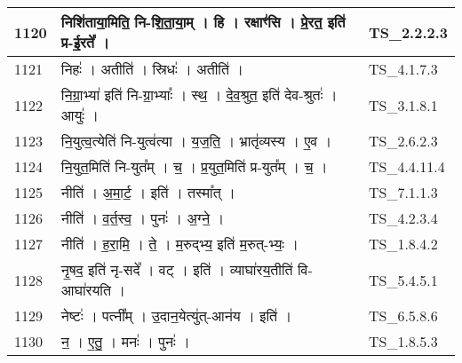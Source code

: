 \documentclass[17pt]{extarticle}
\begin{document}
\begin{longtable}{||p{0.4in}||p{4.9in}||p{0.9in}||}
    1120 & निशि॑ताया॒मिति॒ नि{-}शि॒ता॒या॒म्   ।   हि   ।   रक्षाꣳ॑सि   ।   प्रे॒रत॒ इति॑ प्र{-}ई॒रते᳚   ।    & TS\_2.2.2.3       \\
    
    \hline
        
    1121 & निहः॑   ।   अतीति॑   ।   स्रिधः॑   ।   अतीति॑   ।    & TS\_4.1.7.3       \\
    
    \hline
        
    1122 & नि॒ग्रा॒भ्या॑ इति॑ नि{-}ग्रा॒भ्याः᳚   ।   स्थ॒   ।   दे॒व॒श्रुत॒ इति॑ देव{-}श्रुतः॑   ।   आयुः॑   ।    & TS\_3.1.8.1       \\
    
    \hline
        
    1123 & नि॒युत्व॒त्येति॑ नि{-}युत्व॑त्या   ।   य॒ज॒ति॒   ।   भ्रातृ॑व्यस्य   ।   ए॒व   ।    & TS\_2.6.2.3       \\
    
    \hline
        
    1124 & नि॒युत॒मिति॑ नि{-}युत᳚म्   ।   च॒   ।   प्र॒युत॒मिति॑ प्र{-}युत᳚म्   ।   च॒   ।    & TS\_4.4.11.4       \\
    
    \hline
        
    1125 & नीति॑   ।   अ॒मा॒र्ट॒   ।   इति॑   ।   तस्मा᳚त्   ।    & TS\_7.1.1.3       \\
    
    \hline
        
    1126 & नीति॑   ।   व॒र्त॒स्व॒   ।   पुनः॑   ।   अ॒ग्ने॒   ।    & TS\_4.2.3.4       \\
    
    \hline
        
    1127 & नीति॑   ।   ह॒रा॒मि॒   ।   ते॒   ।   म॒रुद्भ्य॒ इति॑ म॒रुत्{-}भ्यः॒   ।    & TS\_1.8.4.2       \\
    
    \hline
        
    1128 & नृ॒षद॒ इति॑ नृ{-}सदे᳚   ।   वट्   ।   इति॑   ।   व्याघा॑रय॒तीति॑ वि{-}आघा॑रयति   ।    & TS\_5.4.5.1       \\
    
    \hline
        
    1129 & नेष्टः॑   ।   पत्नी᳚म्   ।   उ॒दान॒येत्यु॑त्{-}आन॑य   ।   इति॑   ।    & TS\_6.5.8.6       \\
    
    \hline
        
    1130 & न॒   ।   ए॒तु॒   ।   मनः॑   ।   पुनः॑   ।    & TS\_1.8.5.3       \\
    

\end{longtable}
\end{document}
